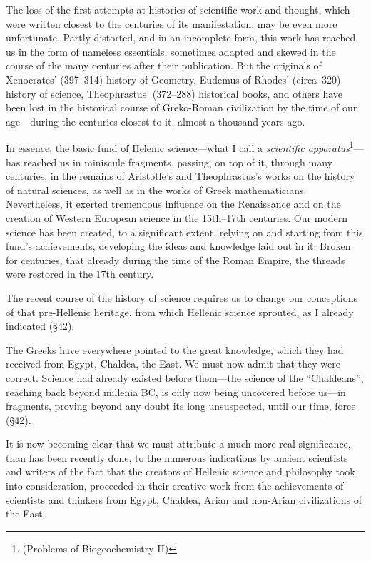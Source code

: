 The loss of the first attempts at histories of scientific work and thought,
which were written closest to the centuries of its manifestation, may be even
more unfortunate.  Partly distorted, and in an incomplete form, this work has
reached us in the form of nameless essentials, sometimes adapted and skewed in
the course of the many centuries after their publication.  But the originals of
Xenocrates' (397--314) history of Geometry, Eudemus of Rhodes' (circa~320)
history of science, Theophrastus' (372--288) historical books, and others have
been lost in the historical course of Greko-Roman civilization by the time of
our age---during the centuries closest to it, almost a thousand years ago.

In essence, the basic fund of Helenic science---what I call a \emph{scientific
apparatus}\footnote{
	\foreignlanguage{russian}{
	(Problems of Biogeochemistry II)}
}---has reached us in miniscule fragments, passing, on top of it, through many
centuries, in the remains of Aristotle's and Theophrastus's works on the
history of natural sciences, as well as in the works of Greek mathematicians.
Nevertheless, it exerted tremendous influence on the Renaissance and on the
creation of Western European science in the 15th--17th centuries.  Our modern
science has been created, to a significant extent, relying on and starting from
this fund's achievements, developing the ideas and knowledge laid out in it.
Broken for centuries, that already during the time of the Roman Empire, the
threads were restored in the 17th century.


\Section %
The recent course of the history of science requires us to change
our conceptions of that pre-Hellenic heritage, from which Hellenic science
sprouted, as I already indicated (§42).

The Greeks have everywhere pointed to the great knowledge, which they had
received from Egypt, Chaldea, the East.  We must now admit that they were
correct.  Science had already existed before them---the science of the
``Chaldeans'', reaching back beyond millenia BC, is only now being uncovered
before us---in fragments, proving beyond any doubt its long unsuspected, until
our time, force (§42).

It is now becoming clear that we must attribute a much more real significance,
than has been recently done, to the numerous indications by ancient scientists
and writers of the fact that the creators of Hellenic science and philosophy
took into consideration, proceeded in their creative work from the achievements
of scientists and thinkers from Egypt, Chaldea, Arian and non-Arian
civilizations of the East.

